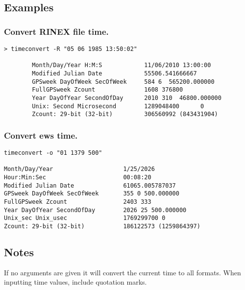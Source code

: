 \subsection{Examples}
\begin{\outputsize}
\subsubsection{Convert RINEX file time.}
\begin{verbatim}
> timeconvert -R "05 06 1985 13:50:02"

        Month/Day/Year H:M:S            11/06/2010 13:00:00
        Modified Julian Date            55506.541666667
        GPSweek DayOfWeek SecOfWeek     584 6  565200.000000
        FullGPSweek Zcount              1608 376800
        Year DayOfYear SecondOfDay      2010 310  46800.000000
        Unix: Second Microsecond        1289048400      0
        Zcount: 29-bit (32-bit)         306560992 (843431904)
\end{verbatim}

\subsubsection{Convert ews time.}
\begin{verbatim}
timeconvert -o "01 1379 500"

Month/Day/Year                    1/25/2026
Hour:Min:Sec                      00:08:20
Modified Julian Date              61065.005787037
GPSweek DayOfWeek SecOfWeek       355 0 500.000000
FullGPSweek Zcount                2403 333
Year DayOfYear SecondOfDay        2026 25 500.000000
Unix_sec Unix_usec                1769299700 0
Zcount: 29-bit (32-bit)           186122573 (1259864397)
\end{verbatim}
\end{\outputsize}
\subsection{Notes}
If no arguments are given it will convert the current time to all formats. When inputting time values, include quotation marks.

%
